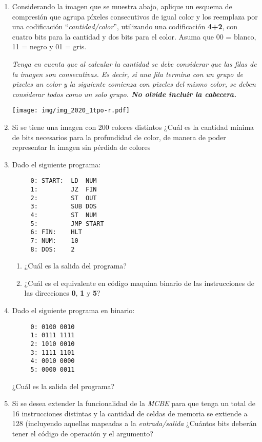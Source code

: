 \documentclass[12pt]{article}
\begin{document}
\begin{enumerate}
    \item Considerando la imagen que se muestra abajo, aplique un esquema de
        compresión que agrupa píxeles consecutivos de igual color y los
        reemplaza por una codificación ``\emph{cantidad/color}'', utilizando
        una codificación \textbf{4+2}, con cuatro bits para la cantidad y dos
        bits para el color. Asuma que 00 = blanco, 11 = negro y 01 = gris.

        \textit{Tenga en cuenta que al calcular la cantidad se debe considerar
        que las filas de la imagen son consecutivas. Es decir, si una fila
        termina con un grupo de pixeles un color y la siguiente comienza con
        pixeles del mismo color, se deben considerar todos como un solo grupo.
        \textbf{No olvide incluir la cabecera.}}

    \texttt{[image: img/img\_2020\_1tpo-r.pdf]}

    \item Si se tiene una imagen con 200 colores distintos ¿Cuál es la
        cantidad mínima de bits necesarios para la profundidad de color, de
        manera de poder representar la imagen sin pérdida de colores

    \item Dado el siguiente programa:

        \begin{verbatim}
     0: START:  LD  NUM
     1:         JZ  FIN
     2:         ST  OUT
     3:         SUB DOS
     4:         ST  NUM
     5:         JMP START
     6: FIN:    HLT
     7: NUM:    10
     8: DOS:    2
        \end{verbatim}

        \begin{enumerate}

            \item ¿Cuál es la salida del programa?


            \item ¿Cuál es el equivalente en código maquina binario de las
                instrucciones de las direcciones \textbf{0}, \textbf{1} y
                \textbf{5}?

        \end{enumerate}

    \item Dado el siguiente programa en binario:

        \begin{verbatim}
     0: 0100 0010
     1: 0111 1111
     2: 1010 0010
     3: 1111 1101
     4: 0010 0000
     5: 0000 0011
        \end{verbatim}

        ¿Cuál es la salida del programa?

    \item Si se desea extender la funcionalidad de la \emph{MCBE} para que
        tenga un total de 16 instrucciones distintas y la cantidad de celdas
        de memoria se extiende a 128 (incluyendo aquellas mapeadas a la
        \emph{entrada/salida} ¿Cuántos bits deberán tener el código de
        operación y el argumento?

\end{enumerate}
\end{document}
